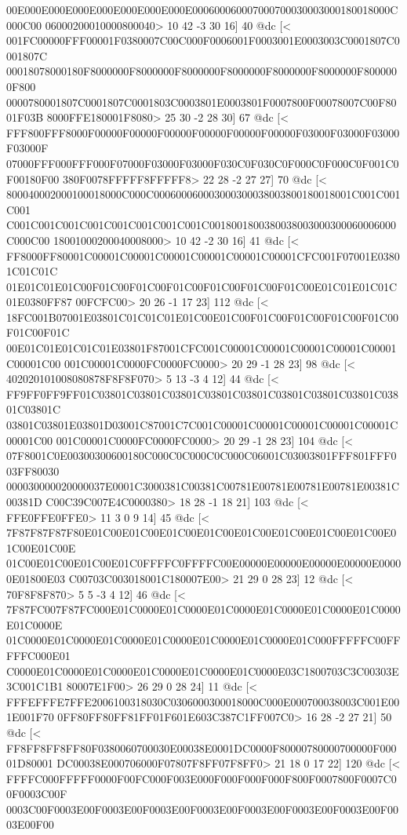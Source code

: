 00E000E000E000E000E000E000E000E000600060007000700030003000180018000C000C00
06000200010000800040>
	 10 42 -3 30 16] 40 @dc
[<
001FC00000FFF00001F0380007C00C000F0006001F0003001E0003003C0001807C0001807C
00018078000180F8000000F8000000F8000000F8000000F8000000F8000000F8000000F800
0000780001807C0001807C0001803C0003801E0003801F0007800F00078007C00F8001F03B
8000FFE180001F8080>
	 25 30 -2 28 30] 67 @dc
[<
FFF800FFF8000F00000F00000F00000F00000F00000F00000F03000F03000F03000F03000F
07000FFF000FFF000F07000F03000F03000F030C0F030C0F000C0F000C0F001C0F00180F00
380F0078FFFFF8FFFFF8>
	 22 28 -2 27 27] 70 @dc
[<
800040002000100018000C000C000600060003000300038003800180018001C001C001C001
C001C001C001C001C001C001C001C001C0018001800380038003000300060006000C000C00
18001000200040008000>
	 10 42 -2 30 16] 41 @dc
[<
FF8000FF80001C00001C00001C00001C00001C00001C00001CFC001F07001E03801C01C01C
01E01C01E01C00F01C00F01C00F01C00F01C00F01C00F01C00E01C01E01C01C01E0380FF87
00FCFC00>
	 20 26 -1 17 23] 112 @dc
[<
18FC001B07001E03801C01C01C01E01C00E01C00F01C00F01C00F01C00F01C00F01C00F01C
00E01C01E01C01C01E03801F87001CFC001C00001C00001C00001C00001C00001C00001C00
001C00001C0000FC0000FC0000>
	 20 29 -1 28 23] 98 @dc
[<
402020101008080878F8F8F070>
	 5 13 -3 4 12] 44 @dc
[<
FF9FF0FF9FF01C03801C03801C03801C03801C03801C03801C03801C03801C03801C03801C
03801C03801E03801D03001C87001C7C001C00001C00001C00001C00001C00001C00001C00
001C00001C0000FC0000FC0000>
	 20 29 -1 28 23] 104 @dc
[<
07F8001C0E00300300600180C000C0C000C0C000C06001C03003801FFF801FFF003FF80030
000030000020000037E0001C3000381C00381C00781E00781E00781E00781E00381C00381D
C00C39C007E4C0000380>
	 18 28 -1 18 21] 103 @dc
[<
FFE0FFE0FFE0>
	 11 3 0 9 14] 45 @dc
[<
7F87F87F87F80E01C00E01C00E01C00E01C00E01C00E01C00E01C00E01C00E01C00E01C00E
01C00E01C00E01C00E01C0FFFFC0FFFFC00E00000E00000E00000E00000E00000E01800E03
C00703C003018001C180007E00>
	 21 29 0 28 23] 12 @dc
[<
70F8F8F870>
	 5 5 -3 4 12] 46 @dc
[<
7F87FC007F87FC000E01C0000E01C0000E01C0000E01C0000E01C0000E01C0000E01C0000E
01C0000E01C0000E01C0000E01C0000E01C0000E01C0000E01C000FFFFFC00FFFFFC000E01
C0000E01C0000E01C0000E01C0000E01C0000E01C0000E03C1800703C3C00303E3C001C1B1
80007E1F00>
	 26 29 0 28 24] 11 @dc
[<
FFFEFFFE7FFE2006100318030C0306000300018000C000E000700038003C001E001E001F70
0FF80FF80FF81FF01F601E603C387C1FF007C0>
	 16 28 -2 27 21] 50 @dc
[<
FF8FF8FF8FF80F0380060700030E00038E0001DC0000F80000780000700000F00001D80001
DC00038E000706000F07807F8FF07F8FF0>
	 21 18 0 17 22] 120 @dc
[<
FFFFC000FFFFF0000F00FC000F003E000F000F000F000F800F0007800F0007C00F0003C00F
0003C00F0003E00F0003E00F0003E00F0003E00F0003E00F0003E00F0003E00F0003E00F00
